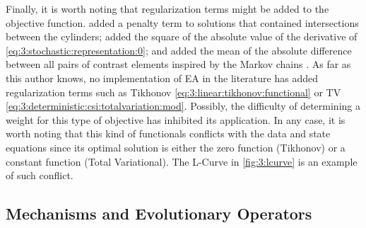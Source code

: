 			
			Finally, it is worth noting that regularization terms might be added to the objective function. \cite{qing2006dynamic} added a penalty term to solutions that contained intersections between the cylinders; \cite{chiu1996image} added the square of the absolute value of the derivative of \eqref{eq:3:stochastic:representation:0}; \cite{pastorino2000microwave} and \cite{caorsi2001microwave} added the mean of the absolute difference between all pairs of contrast elements inspired by the Markov chains \citep{caorsi1994microwave}. As far as this author knows, no implementation of EA in the literature has added regularization terms such as Tikhonov \eqref{eq:3:linear:tikhonov:functional} or TV \eqref{eq:3:deterministic:csi:totalvariation:mod}. Possibly, the difficulty of determining a weight for this type of objective has inhibited its application. In any case, it is worth noting that this kind of functionals conflicts with the data and state equations since its optimal solution is either the zero function (Tikhonov) or a constant function (Total Variational). The L-Curve in \autoref{fig:3:lcurve} is an example of such conflict.
			
		\subsection{Mechanisms and Evolutionary Operators}\label{chap:methods:stochastic:mechanism}
		
